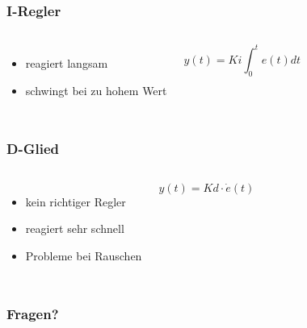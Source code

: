 \documentclass[12pt,a4paper, ngerman]{beamer}
\begin{document}
\begin{frame}
\frametitle{I-Regler}
\begin{columns}
\begin{itemize}
\item reagiert langsam
\item schwingt bei zu hohem Wert
\end{itemize}
\begin{equation*}
y(t)=Ki\int_{0}^{t}e(t)dt
\end{equation*}
\end{columns}
\end{frame}

\begin{frame}
\frametitle{D-Glied}
\begin{columns}
\begin{itemize}
\item kein richtiger Regler
\item reagiert sehr schnell
\item Probleme bei Rauschen
\end{itemize}
\begin{equation*}
y(t)=Kd\cdot \dot{e}(t)
\end{equation*}
\end{columns}
\end{frame}


\begin{frame}
\frametitle{Fragen?}
\begin{center}
\color{blue}
\end{center}
\end{frame}
\end{document}
